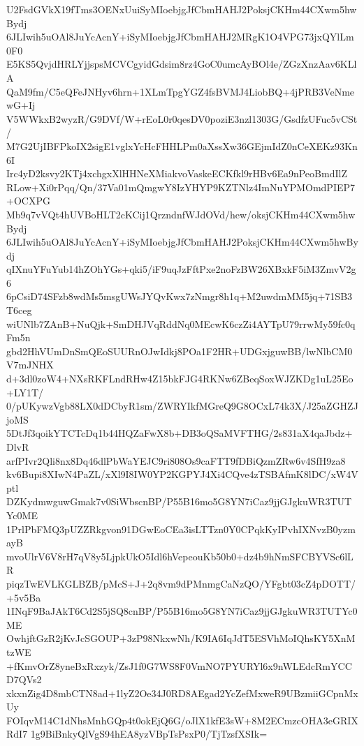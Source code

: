 U2FsdGVkX19fTms3OENxUuiSyMIoebjgJfCbmHAHJ2PoksjCKHm44CXwm5hwBydj
6JLIwih5uOAl8JuYcAcnY+iSyMIoebjgJfCbmHAHJ2MRgK1O4VPG73jxQYlLm0F0
E5KS5QvjdHRLYjjspsMCVCgyidGdsim8rz4GoC0umcAyBOl4e/ZGzXnzAav6KLlA
QaM9fm/C5eQFeJNHyv6hrn+1XLmTpgYGZ4fsBVMJ4LiobBQ+4jPRB3VeNmewG+Ij
V5WWkxB2wyzR/G9DVf/W+rEoL0r0qesDV0poziE3nzl1303G/GsdfzUFuc5vCSt/
M7G2UjIBFPkoIX2sigE1vglxYcHcFHHLPm0aXssXw36GEjmIdZ0nCeXEKz93Kn6I
Irc4yD2ksvy2KTj4xchgxXlHHNeXMiakvoVaskeECKfkl9rHBv6Ea9nPeoBmdIlZ
RLow+Xi0rPqq/Qn/37Va01mQmgwY8IzYHYP9KZTNlz4ImNuYPMOmdPIEP7+OCXPG
Mb9q7vVQt4hUVBoHLT2cKCij1QrzndnfWJdOVd/hew/oksjCKHm44CXwm5hwBydj
6JLIwih5uOAl8JuYcAcnY+iSyMIoebjgJfCbmHAHJ2PoksjCKHm44CXwm5hwBydj
qIXnuYFuYub14hZOhYGs+qki5/iF9uqJzFftPxe2noFzBW26XBxkF5iM3ZmvV2g6
6pCsiD74SFzb8wdMs5msgUWsJYQvKwx7zNmgr8h1q+M2uwdmMM5jq+71SB3T6ceg
wiUNlb7ZAnB+NuQjk+SmDHJVqRddNq0MEcwK6czZi4AYTpU79rrwMy59fc0qFm5n
gbd2HhVUmDnSmQEoSUURnOJwIdkj8POa1F2HR+UDGxjguwBB/lwNlbCM0V7mJNHX
d+3dl0zoW4+NXsRKFLndRHw4Z15bkFJG4RKNw6ZBeqSoxWJZKDg1uL25Eo+LY1T/
0/pUKywzVgb88LX0dDCbyR1sm/ZWRYIkfMGreQ9G8OCxL74k3X/J25aZGHZJjoMS
5DtJf3qoikYTCTcDq1b44HQZaFwX8b+DB3oQSaMVFTHG/2s831aX4qaJbdz+DlvR
arfPIvr2Qli8nx8Dq46dlPbWaYEJC9ri808Os9caFTT9fDBiQzmZRw6v4SfH9za8
kv6Bupi8XIwN4PaZL/xXl9I8IW0YP2KGPYJ4Xi4CQve4zTSBAfmK8lDC/xW4Vptl
DZKydmwguwGmak7v0SiWbscnBP/P55B16mo5G8YN7iCaz9jjGJgkuWR3TUTYc0ME
1PrlPbFMQ3pUZZRkgvon91DGwEoCEa3isLTTzn0Y0CPqkKyIPvhIXNvzB0yzmayB
mvoUlrV6V8rH7qV8y5LjpkUkO5Idl6hVepeouKb50b0+dz4b9hNmSFCBYVSc6lLR
piqzTwEVLKGLBZB/pMcS+J+2q8vm9dPMnmgCaNzQO/YFgbt03cZ4pDOTT/+5v5Ba
1INqF9BaJAkT6Cd2S5jSQ8cnBP/P55B16mo5G8YN7iCaz9jjGJgkuWR3TUTYc0ME
OwhjftGzR2jKvJcSGOUP+3zP98NkxwNh/K9IA6IqJdT5ESVhMoIQhsKY5XnMtzWE
+fKmvOrZ8yneBxRxzyk/ZsJ1f0G7WS8F0VmNO7PYURYl6x9nWLEdcRmYCCD7QVs2
xkxnZig4D8mbCTN8ad+1lyZ2Oe34J0RD8AEgad2YcZefMxweR9UBzmiiGCpnMxUy
FOIqvM14C1dNhsMnhGQp4t0okEjQ6G/oJlX1kfE3sW+8M2ECmzcOHA3eGRIXRdI7
1g9BiBnkyQlVgS94hEA8yzVBpTsPsxP0/TjTzsfXSIk=

